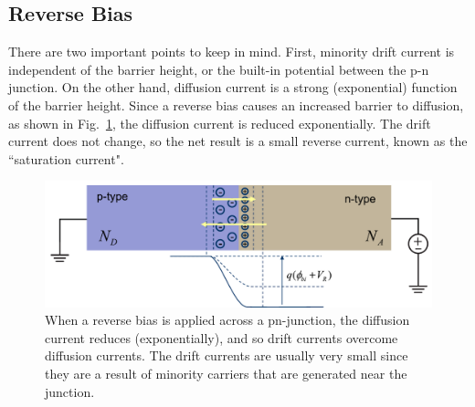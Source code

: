 \subsection{Reverse Bias}
There are two important points to keep in mind.  First, minority drift current is independent of the barrier height, or the built-in potential between the p-n junction.  On the other hand, diffusion current is a strong (exponential) function of the barrier height.  Since a reverse bias causes an increased barrier to diffusion, as shown in Fig.~\ref{fig:slide36}, the diffusion current is reduced exponentially.  The drift current does not change, so the net result is a small reverse current, known as the ``saturation current".  
\begin{figure}[tb]
\centering
\includegraphics[width=.75\columnwidth]{slide36}
\caption{When a reverse bias is applied across a pn-junction, the diffusion current reduces (exponentially), and so drift currents overcome diffusion currents.  The drift currents are usually very small since they are a result of minority carriers that are generated near the junction.}
\label{fig:slide36}
\end{figure}
